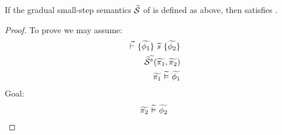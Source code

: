 \begin{theorem}[]
    If the gradual small-step semantics $\widetilde{\mathcal{S}}$ of \gvl is defined as above, then \gvl satisfies .
\end{theorem}
\begin{proof}
    To prove  we may assume:
    \begin{align}
    \label{frm:tmp0}
    {} \,\,\vec{\vdash}\,\, \{{\widetilde{\phi_1}}\} ~{\widetilde{s}}~ \{{\widetilde{\phi_2}}\}\\
    \label{frm:tmp1}
    \widetilde{\mathcal{S}}^{\widetilde{s}}(\widetilde{\pi_1}, \widetilde{\pi_2})\\
    \label{frm:tmp2}
    \widetilde{\pi_1} \,\,\widetilde{\vDash}\,\, \widetilde{\phi_1}
    \end{align}
    Goal: 
    \begin{align}
    \label{frm:tmp3}
    \widetilde{\pi_2} \,\,\widetilde{\vDash}\,\, \widetilde{\phi_2}
    \end{align}
    

\end{proof}
